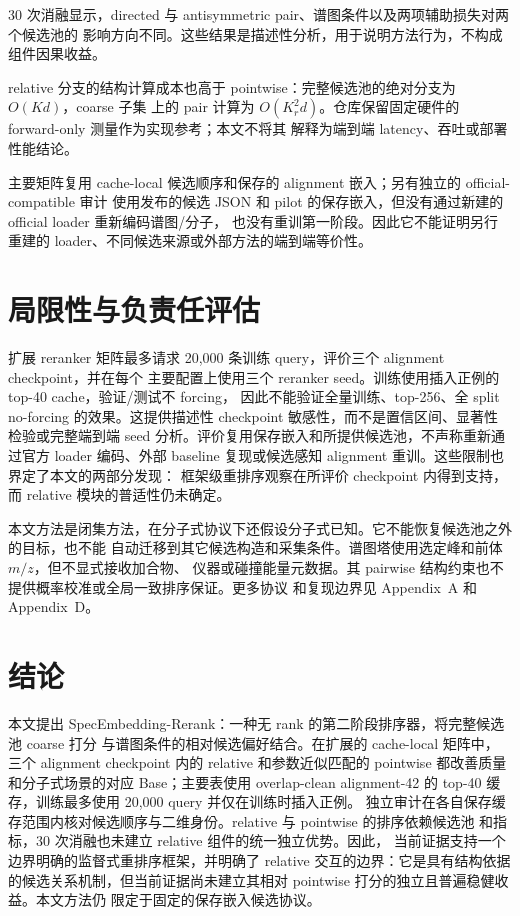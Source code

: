 \documentclass[UTF8,11pt]{ctexart}
\newcommand{\method}{SpecEmbedding-Rerank}
\begin{document}
30 次消融显示，directed 与 antisymmetric pair、谱图条件以及两项辅助损失对两个候选池的
影响方向不同。这些结果是描述性分析，用于说明方法行为，不构成组件因果收益。

relative 分支的结构计算成本也高于 pointwise：完整候选池的绝对分支为 $O(Kd)$，coarse 子集
上的 pair 计算为 $O(K_r^2d)$。仓库保留固定硬件的 forward-only 测量作为实现参考；本文不将其
解释为端到端 latency、吞吐或部署性能结论。

主要矩阵复用 cache-local 候选顺序和保存的 alignment 嵌入；另有独立的 official-compatible 审计
使用发布的候选 JSON 和 pilot 的保存嵌入，但没有通过新建的 official loader 重新编码谱图/分子，
也没有重训第一阶段。因此它不能证明另行重建的 loader、不同候选来源或外部方法的端到端等价性。

\section{局限性与负责任评估}

扩展 reranker 矩阵最多请求 20,000 条训练 query，评价三个 alignment checkpoint，并在每个
主要配置上使用三个 reranker seed。训练使用插入正例的 top-40 cache，验证/测试不 forcing，
因此不能验证全量训练、top-256、全 split no-forcing 的效果。这提供描述性 checkpoint 敏感性，而不是置信区间、显著性
检验或完整端到端 seed 分析。评价复用保存嵌入和所提供候选池，不声称重新通过官方 loader
编码、外部 baseline 复现或候选感知 alignment 重训。这些限制也界定了本文的两部分发现：
框架级重排序观察在所评价 checkpoint 内得到支持，而 relative 模块的普适性仍未确定。

本文方法是闭集方法，在分子式协议下还假设分子式已知。它不能恢复候选池之外的目标，也不能
自动迁移到其它候选构造和采集条件。谱图塔使用选定峰和前体 $m/z$，但不显式接收加合物、
仪器或碰撞能量元数据。其 pairwise 结构约束也不提供概率校准或全局一致排序保证。更多协议
和复现边界见 Appendix~A 和 Appendix~D。

\section{结论}

本文提出 \method{}：一种无 rank 的第二阶段排序器，将完整候选池 coarse 打分
与谱图条件的相对候选偏好结合。在扩展的 cache-local 矩阵中，三个 alignment checkpoint 内的
relative 和参数近似匹配的 pointwise 都改善质量和分子式场景的对应 Base；主要表使用
overlap-clean alignment-42 的 top-40 缓存，训练最多使用 20,000 query 并仅在训练时插入正例。
独立审计在各自保存缓存范围内核对候选顺序与二维身份。relative 与 pointwise 的排序依赖候选池
和指标，30 次消融也未建立 relative 组件的统一独立优势。因此，
当前证据支持一个边界明确的监督式重排序框架，并明确了 relative 交互的边界：它是具有结构依据
的候选关系机制，但当前证据尚未建立其相对 pointwise 打分的独立且普遍稳健收益。本文方法仍
限定于固定的保存嵌入候选协议。
\end{document}
